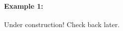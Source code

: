 \documentclass[../revisedmain.tex]{subfiles}
\begin{document}
	\paragraph{Example 1:} Under construction! Check back later.\\
\end{document}
